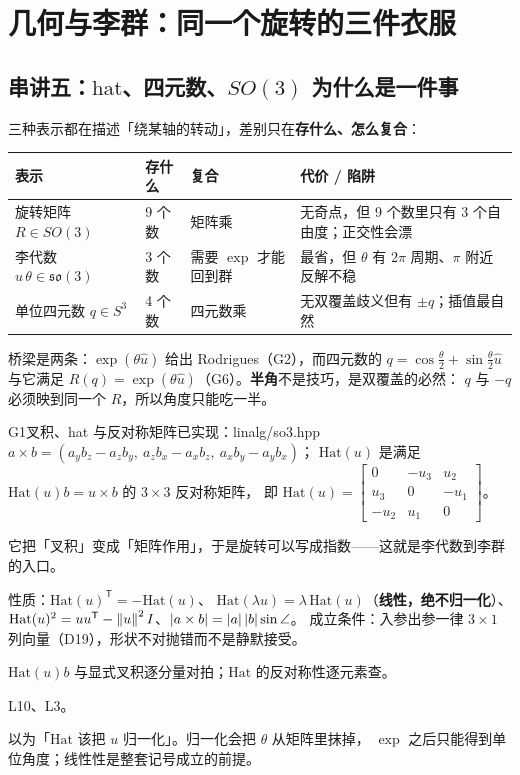 \section{几何与李群：同一个旋转的三件衣服}

\subsection*{串讲五：$\mathrm{hat}$、四元数、$SO(3)$ 为什么是一件事}

三种表示都在描述「绕某轴的转动」，差别只在\textbf{存什么、怎么复合}：

\begin{center}
\begin{tabular}{L{2.3cm}L{3.2cm}L{3.4cm}L{4.2cm}}
\toprule
表示 & 存什么 & 复合 & 代价 / 陷阱 \\
\midrule
旋转矩阵 $R\in SO(3)$ & 9 个数 & 矩阵乘 & 无奇点，但 9 个数里只有 3 个自由度；正交性会漂 \\
李代数 $\hat u\,\theta\in\mathfrak{so}(3)$ & 3 个数 & 需要 $\exp$ 才能回到群 & 最省，但 $\theta$ 有 $2\pi$ 周期、$\pi$ 附近反解不稳 \\
单位四元数 $q\in S^{3}$ & 4 个数 & 四元数乘 & 无双覆盖歧义但有 $\pm q$；插值最自然 \\
\bottomrule
\end{tabular}
\end{center}

桥梁是两条：$\exp(\theta\hat u)$ 给出 Rodrigues（G2），而四元数的 $q=\cos\frac\theta2+\sin\frac\theta2\hat u$
与它满足 $R(q)=\exp(\theta\hat u)$（G6）。\textbf{半角}不是技巧，是双覆盖的必然：
$q$ 与 $-q$ 必须映到同一个 $R$，所以角度只能吃一半。

\begin{know}{G1}{叉积、hat 与反对称矩阵}{已实现：linalg/so3.hpp}
 $a\times b=(a_yb_z-a_zb_y,\ a_zb_x-a_xb_z,\ a_xb_y-a_yb_x)$；
$\mathrm{Hat}(u)$ 是满足 $\mathrm{Hat}(u)b=u\times b$ 的 $3\times3$ 反对称矩阵，
即 $\mathrm{Hat}(u)=\begin{bmatrix}0&-u_3&u_2\\u_3&0&-u_1\\-u_2&u_1&0\end{bmatrix}$。

 它把「叉积」变成「矩阵作用」，于是旋转可以写成指数——这就是李代数到李群的入口。

 性质：$\mathrm{Hat}(u)^{\mathsf T}=-\mathrm{Hat}(u)$、
$\mathrm{Hat}(\lambda u)=\lambda\,\mathrm{Hat}(u)$（\textbf{线性，绝不归一化}）、
$\mathrm{Hat}(u)^{2}=uu^{\mathsf T}-\left\lVert u\right\rVert^{2}I$、$\left\lvert a\times b\right\rvert=\left\lvert a\right\rvert\left\lvert b\right\rvert\sin\angle$。
成立条件：入参出参一律 $3\times1$ 列向量（D19），形状不对抛错而不是静默接受。

 $\mathrm{Hat}(u)b$ 与显式叉积逐分量对拍；$\mathrm{Hat}$ 的反对称性逐元素查。

 L10、L3。

 以为「$\mathrm{Hat}$ 该把 $u$ 归一化」。归一化会把 $\theta$ 从矩阵里抹掉，
$\exp$ 之后只能得到单位角度；线性性是整套记号成立的前提。
\end{know}

